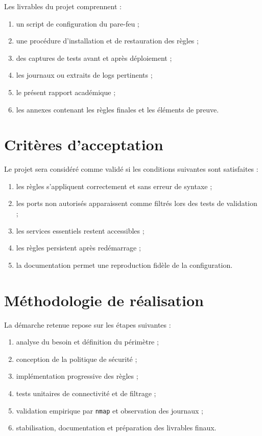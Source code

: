 Les livrables du projet comprennent :
\begin{enumerate}
    \item un script de configuration du pare-feu ;
    \item une procédure d'installation et de restauration des règles ;
    \item des captures de tests avant et après déploiement ;
    \item les journaux ou extraits de logs pertinents ;
    \item le présent rapport académique ;
    \item les annexes contenant les règles finales et les éléments de preuve.
\end{enumerate}

\section{Critères d'acceptation}

Le projet sera considéré comme validé si les conditions suivantes sont satisfaites :
\begin{enumerate}
    \item les règles s'appliquent correctement et sans erreur de syntaxe ;
    \item les ports non autorisés apparaissent comme filtrés lors des tests de validation ;
    \item les services essentiels restent accessibles ;
    \item les règles persistent après redémarrage ;
    \item la documentation permet une reproduction fidèle de la configuration.
\end{enumerate}

\section{Méthodologie de réalisation}

La démarche retenue repose sur les étapes suivantes :
\begin{enumerate}
    \item analyse du besoin et définition du périmètre ;
    \item conception de la politique de sécurité ;
    \item implémentation progressive des règles ;
    \item tests unitaires de connectivité et de filtrage ;
    \item validation empirique par \texttt{nmap} et observation des journaux ;
    \item stabilisation, documentation et préparation des livrables finaux.
\end{enumerate}

